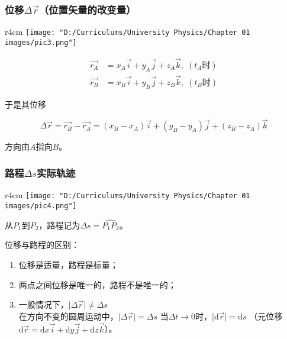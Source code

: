 \documentclass[12pt, a4paper]{article}
\newcommand{\rmd}{\mathrm{d}}
\begin{document}
\subsubsection{位移\(\Delta \overrightarrow{r}\)（位置矢量的改变量）}


    \begin{wrapfigure}{r}{4cm}
        \centering
        \texttt{[image: "D:/Curriculums/University Physics/Chapter 01 images/pic3.png"]}
        \label{pic3}
    \end{wrapfigure}

    \begin{align*}
        \overrightarrow{r_{A}} &=
        x_{A}\overrightarrow{i} + y_{A}\overrightarrow{j} + z_{A}\overrightarrow{k}
        ,\; \left(t_{A}\text{时}\right) \\
        \overrightarrow{r_{B}} &=
        x_{B}\overrightarrow{i} + y_{B}\overrightarrow{j} + z_{B}\overrightarrow{k}
        ,\; \left(t_{B}\text{时}\right)
    \end{align*}

    于是其位移

    \[\Delta \overrightarrow{r} = \overrightarrow{r_{B}} - \overrightarrow{r_{A}}
    = \left(x_{B} - x_{A}\right)\overrightarrow{i} + \left(y_{B} - y_{A}\right)\overrightarrow{j}
    + \left(z_{B} - z_{A}\right)\overrightarrow{k}
    \]
    
    方向由\(A\)指向\(B\)。

\subsubsection{路程\(\Delta s\)实际轨迹}

    \begin{wrapfigure}{r}{4cm}
        \centering
        \texttt{[image: "D:/Curriculums/University Physics/Chapter 01 images/pic4.png"]}
        \label{pic4}
    \end{wrapfigure}

    从\(P_{1}\)到\(P_{2}\)，路程记为\(\Delta s = \hat{P_{1}P_{2}}\)。

    位移与路程的区别：

    \begin{enumerate}
        \item 位移是适量，路程是标量；
        \item 两点之间位移是唯一的，路程不是唯一的；
        \item 一般情况下，\(\lvert\Delta \overrightarrow{r}\rvert \neq \Delta s\)
            \\
            在方向不变的圆周运动中，\(\lvert\Delta \overrightarrow{r}\rvert = \Delta s\)
            当\(\Delta t \rightarrow 0\)时，\(\lvert \rmd \overrightarrow{r}\rvert = \rmd s\)
            （元位移\(\rmd \overrightarrow{r} = \rmd x \overrightarrow{i} +
            \rmd y \overrightarrow{j} + \rmd z \overrightarrow{k}\)）。
    \end{enumerate}
\end{document}
